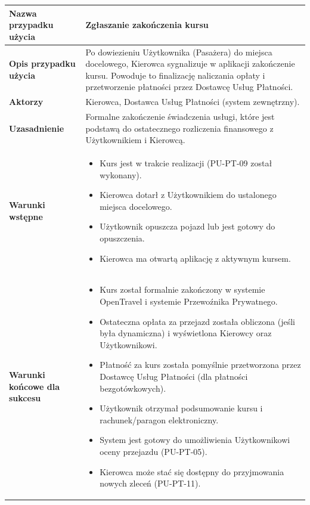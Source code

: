 \documentclass[a4paper,12pt]{article}
\begin{document}
\begin{longtable}{|p{\pierwszakolumnaszerokoscPUTPTZakonczenie}|p{\drugakolumnaszerokoscPUTPTZakonczenie}|}
    \textbf{Nazwa przypadku użycia} & Zgłaszanie zakończenia kursu \\
    \hline
    \textbf{Opis przypadku użycia} & Po dowiezieniu Użytkownika (Pasażera) do miejsca docelowego, Kierowca sygnalizuje w aplikacji zakończenie kursu. Powoduje to finalizację naliczania opłaty i przetworzenie płatności przez Dostawcę Usług Płatności. \\
    \hline
    \textbf{Aktorzy} & Kierowca, Dostawca Usług Płatności (system zewnętrzny). \\
    \hline
    \textbf{Uzasadnienie} & Formalne zakończenie świadczenia usługi, które jest podstawą do ostatecznego rozliczenia finansowego z Użytkownikiem i Kierowcą. \\
    \hline
    \textbf{Warunki wstępne} &
        \begin{itemize} \itemsep0pt \parskip0pt \parsep0pt
            \item Kurs jest w trakcie realizacji (PU-PT-09 został wykonany).
            \item Kierowca dotarł z Użytkownikiem do ustalonego miejsca docelowego.
            \item Użytkownik opuszcza pojazd lub jest gotowy do opuszczenia.
            \item Kierowca ma otwartą aplikację z aktywnym kursem.
        \end{itemize} \\
    \hline
    \textbf{Warunki końcowe dla sukcesu} &
        \begin{itemize} \itemsep0pt \parskip0pt \parsep0pt
            \item Kurs został formalnie zakończony w systemie OpenTravel i systemie Przewoźnika Prywatnego.
            \item Ostateczna opłata za przejazd została obliczona (jeśli była dynamiczna) i wyświetlona Kierowcy oraz Użytkownikowi.
            \item Płatność za kurs została pomyślnie przetworzona przez Dostawcę Usług Płatności (dla płatności bezgotówkowych).
            \item Użytkownik otrzymał podsumowanie kursu i rachunek/paragon elektroniczny.
            \item System jest gotowy do umożliwienia Użytkownikowi oceny przejazdu (PU-PT-05).
            \item Kierowca może stać się dostępny do przyjmowania nowych zleceń (PU-PT-11).
        \end{itemize} \\

\end{longtable}
\end{document}
